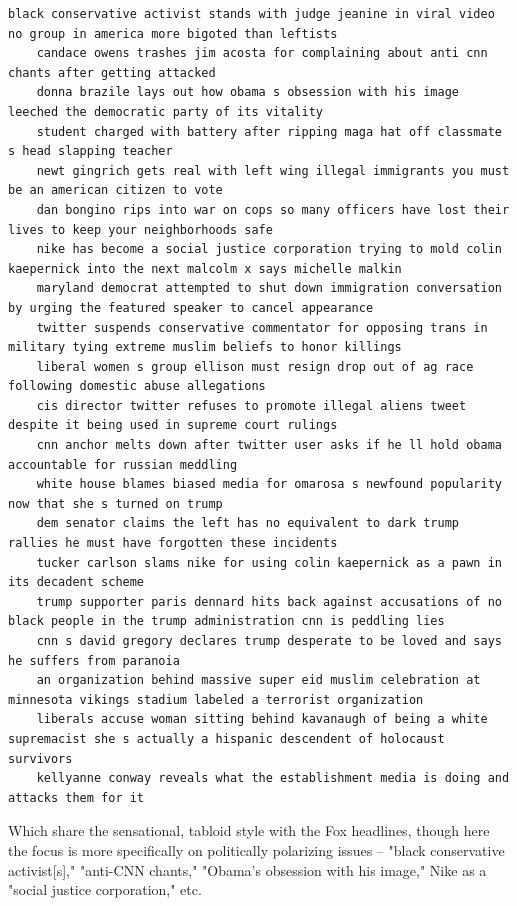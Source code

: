 \documentclass{scrartcl}
\begin{document}
\begin{lstlisting}[basicstyle=\tiny\hlfont]
    black conservative activist stands with judge jeanine in viral video no group in america more bigoted than leftists
    candace owens trashes jim acosta for complaining about anti cnn chants after getting attacked
    donna brazile lays out how obama s obsession with his image leeched the democratic party of its vitality
    student charged with battery after ripping maga hat off classmate s head slapping teacher
    newt gingrich gets real with left wing illegal immigrants you must be an american citizen to vote
    dan bongino rips into war on cops so many officers have lost their lives to keep your neighborhoods safe
    nike has become a social justice corporation trying to mold colin kaepernick into the next malcolm x says michelle malkin
    maryland democrat attempted to shut down immigration conversation by urging the featured speaker to cancel appearance
    twitter suspends conservative commentator for opposing trans in military tying extreme muslim beliefs to honor killings
    liberal women s group ellison must resign drop out of ag race following domestic abuse allegations
    cis director twitter refuses to promote illegal aliens tweet despite it being used in supreme court rulings
    cnn anchor melts down after twitter user asks if he ll hold obama accountable for russian meddling
    white house blames biased media for omarosa s newfound popularity now that she s turned on trump
    dem senator claims the left has no equivalent to dark trump rallies he must have forgotten these incidents
    tucker carlson slams nike for using colin kaepernick as a pawn in its decadent scheme
    trump supporter paris dennard hits back against accusations of no black people in the trump administration cnn is peddling lies
    cnn s david gregory declares trump desperate to be loved and says he suffers from paranoia
    an organization behind massive super eid muslim celebration at minnesota vikings stadium labeled a terrorist organization
    liberals accuse woman sitting behind kavanaugh of being a white supremacist she s actually a hispanic descendent of holocaust survivors
    kellyanne conway reveals what the establishment media is doing and attacks them for it
\end{lstlisting}

Which share the sensational, tabloid style with the Fox headlines, though here the focus is more specifically on politically polarizing issues -- "black conservative activist[s]," "anti-CNN chants," "Obama's obsession with his image," Nike as a "social justice corporation," etc.
\end{document}

